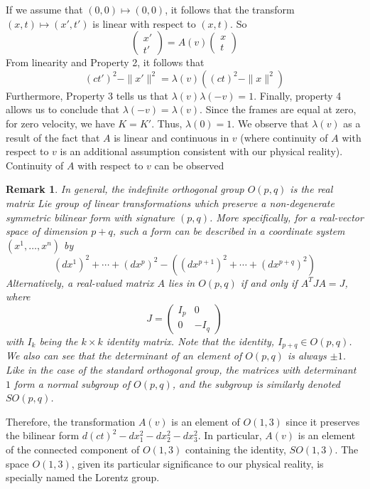 \documentclass{article}
\newcommand{\nl}{\newline\newline\noindent}
\newtheorem{rk}{Remark}
\begin{document}
If we assume that $(0,0)\mapsto (0,0)$, it follows that the transform $(x,t)\mapsto (x',t')$ is linear with respect to $(x,t)$. So
\[\begin{pmatrix}
    x'\\
    t'
\end{pmatrix}=A(v)\begin{pmatrix}
    x\\
    t
\end{pmatrix}\]
From linearity and Property 2, it follows that 
\begin{equation}
    (ct')^2-\|x'\|^2 = \lambda(v)((ct)^2 - \|x\|^2)
\end{equation}
Furthermore, Property 3 tells us that $\lambda(v)\lambda(-v) = 1$. Finally, property 4 allows us to conclude that $\lambda(-v) = \lambda(v)$. Since the frames are equal at zero, for zero velocity, we have $K=K'$. Thus, $\lambda(0) = 1$. We observe that $\lambda(v)$ as a result of the fact that $A$ is linear and continuous in $v$ (where continuity of $A$ with respect to $v$ is an additional assumption consistent with our physical reality).
\nl
Continuity of $A$ with respect to $v$ can be observed 
\nl
\begin{rk}
    In general, the indefinite orthogonal group $O(p,q)$ is the real matrix Lie group of linear transformations which preserve a non-degenerate symmetric bilinear form with signature $(p,q)$. More specifically, for a real-vector space of dimension $p+q$, such a form can be described in a coordinate system $(x^1,\dots, x^n)$ by 
    \[(dx^1)^2 + \cdots + (dx^p)^2 - \left((dx^{p+1})^2 + \cdots + (dx^{p+q})^2\right)\]
    Alternatively, a real-valued matrix $A$ lies in $O(p,q)$ if and only if $A^TJA = J$, where 
    \[J = \begin{pmatrix}
        I_p & 0 \\
        0 & -I_q
    \end{pmatrix}\]
    with $I_k$ being the $k\times k$ identity matrix. Note that the identity, $I_{p+q}\in O(p,q)$. We also can see that the determinant of an element of $O(p,q)$ is always $\pm 1$. Like in the case of the standard orthogonal group, the matrices with determinant $1$ form a normal subgroup of $O(p,q)$, and the subgroup is similarly denoted $SO(p,q)$.
\end{rk}
Therefore, the transformation $A(v)$ is an element of $O(1,3)$ since it preserves the bilinear form $d(ct)^2 - dx_1^2 - dx_2^2 - dx_3^2$. In particular, $A(v)$ is an element of the connected component of $O(1,3)$ containing the identity, $SO(1,3)$. The space $O(1,3)$, given its particular significance to our physical reality, is specially named the Lorentz group.
\end{document}
